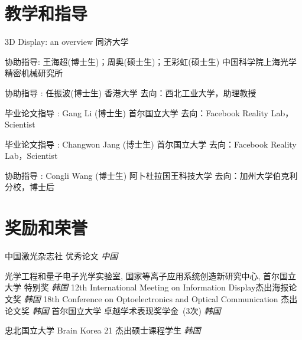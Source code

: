 \documentclass[10pt,a4paper]{moderncv}
\begin{document}


\section{教学和指导}
{3D Display: an overview}
{同济大学}
{}
{}
{}

{协助指导: 王海超(博士生)；周奥(硕士生)；王彩虹(硕士生)}
{中国科学院上海光学精密机械研究所}
{}
{}
{}

{协助指导 : 任振波(博士生)}
{香港大学}
{}
{}
{去向：西北工业大学，助理教授}


{毕业论文指导 : Gang Li (博士生)}
{首尔国立大学}
{}
{}
{去向：Facebook Reality Lab，Scientist}

{毕业论文指导 : Changwon Jang (博士生)}
{首尔国立大学}
{}
{}
{去向：Facebook Reality Lab，Scientist}

{协助指导 : Congli Wang (博士生)}
{阿卜杜拉国王科技大学}
{}
{}
{去向：加州大学伯克利分校，博士后}

\section{奖励和荣誉}
{中国激光杂志社}
{优秀论文}
{}
{\textit{中国}}
{}


{光学工程和量子电子光学实验室, 国家等离子应用系统创造新研究中心, 首尔国立大学}
{特别奖}
{}
{\textit{韩国}}
{}
{12th International Meeting on Information Display}{杰出海报论文奖}
{}
{\textit{韩国}}
{}
{18th Conference on Optoelectronics and Optical Communication}
{杰出论文奖}
{}
{\textit{韩国}}
{}
{首尔国立大学}
{卓越学术表现奖学金~(3次)}
{}
{\textit{韩国}}
{}

{忠北国立大学}
{Brain Korea 21 杰出硕士课程学生}
{}
{\textit{韩国}}
{}
\end{document}
